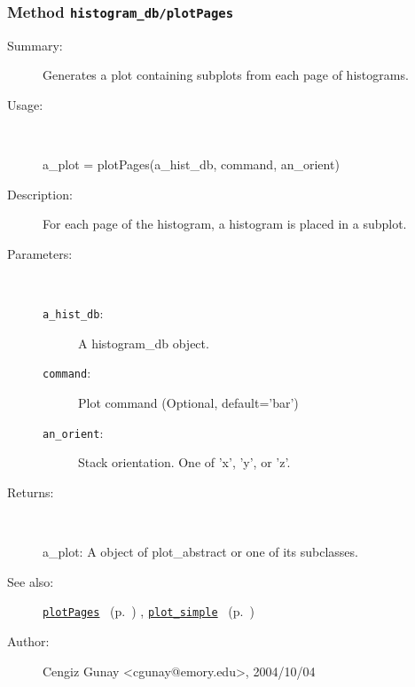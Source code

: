 \subsubsection[Method \texttt{plotPages}]{Method \texttt{histogram\_db/plotPages}}%
%
\label{ref_histogram_db__plotPages}%
\hypertarget{ref_histogram_db__plotPages}{}%
\begin{description}
\item[Summary:]Generates a plot containing subplots from each page of histograms.
%
\item[Usage:]~%
\begin{lyxcode}%
a\_plot = plotPages(a\_hist\_db, command, an\_orient)
%
\end{lyxcode}%
%
\item[Description:]%
For each page of the histogram, a histogram is placed in a subplot.
\item[Parameters:]~
\begin{description}%
\item[\texttt{a\_hist\_db}:]
 A histogram\_db object.
\item[\texttt{command}:]
 Plot command (Optional, default='bar')
\item[\texttt{an\_orient}:]
 Stack orientation. One of 'x', 'y', or 'z'.
\end{description}%
%
\item[Returns:]~

	a\_plot: A object of plot\_abstract or one of its subclasses.
%
%
\item[See also:]%
\hyperlink{ref_plotPages}{\texttt{plotPages}}%
\ (p.~\pageref{ref_plotPages})%
%
, \hyperlink{ref_plot_simple}{\texttt{plot\_simple}}%
\ (p.~\pageref{ref_plot_simple})%
%
%
\item[Author:]%
Cengiz Gunay <cgunay@emory.edu>, 2004/10/04%
\end{description}
\methodline%
